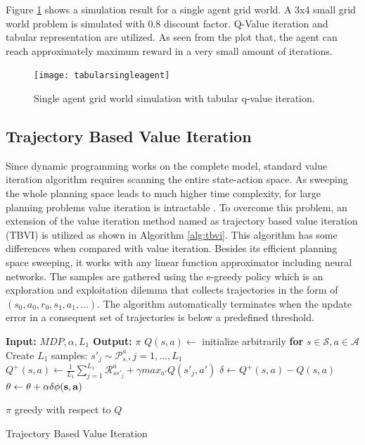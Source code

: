 \documentclass{ituphdreport}
\begin{document}
Figure \ref{fig:tabularsingleagent} shows a simulation result for a single agent grid world. A 3x4 small grid world problem is simulated with 0.8 discount factor. Q-Value iteration and tabular representation are utilized. As seen from the plot that, the agent can reach approximately maximum reward in a very small amount of iterations.

\begin{figure}[h]
	\begin{center}
		\texttt{[image: tabularsingleagent]}
	\end{center}
	\caption{Single agent grid world simulation with tabular q-value iteration.
		\label{fig:tabularsingleagent}}
\end{figure}

\subsection{Trajectory Based Value Iteration }
Since dynamic programming works on the complete model, standard value iteration algorithm requires scanning the entire state-action space. As sweeping the whole planning space leads to much higher time complexity, for large planning problems value iteration is intractable \cite{zhou2015trajectory}. To overcome this problem, an extension of the value iteration method named as trajectory based value iteration (TBVI) is utilized \cite{geramifard:1} as shown in Algorithm \ref{alg:tbvi}. This algorithm has some differences when compared with value iteration. Besides its efficient planning space sweeping, it works with any linear function approximator including neural networks. The samples are gathered using the e-greedy policy which is an exploration and exploitation dilemma that collects trajectories in the form of $(s_0, a_0, r_0, s_1, a_1, ...)$. The algorithm automatically terminates when the update error in a consequent set of trajectories is below a predefined threshold.

\begin{algorithm}[H]
\begin{algorithmic}
	\Statex \textbf{Input:} $MDP, \alpha, L_1 $
	\Statex \textbf{Output:} $\pi$
	\State $Q(s,a) \leftarrow $ initialize arbitrarily  \textbf{for} $s\in 
	\mathcal{S}, a\in \mathcal{A}$
	\State Create $L_1$ samples: $s'_j \sim \mathcal{P}^a_{s.}, j=1,...,L_1$
	\State $Q^+(s,a) \leftarrow \frac{1}{L_1} \sum_{j=1}^{L_1} \mathcal{R}^a_{ss'_j} + \gamma max_{a'} Q (s'_j,a')$
	\State $\delta \leftarrow Q^+(s,a) - Q(s,a)$
	\State $\bf{\theta} \leftarrow \theta + \alpha\delta\phi(s,a)$
	
	\EndFor
	\EndWhile
	\Return $\pi$ greedy with respect to $Q$
	\EndProcedure
\end{algorithmic}
\caption{Trajectory Based Value Iteration}
\label{alg:tbvi}
\end{algorithm}
\end{document}
